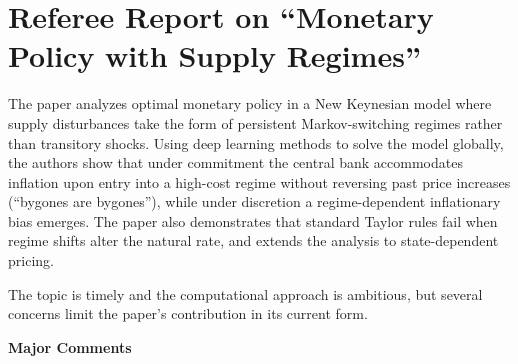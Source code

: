 \documentclass[12pt]{article}
\begin{document}

\section*{Referee Report on ``Monetary Policy with Supply Regimes''}

The paper analyzes optimal monetary policy in a New Keynesian model where supply disturbances take the form of persistent Markov-switching regimes rather than transitory shocks. Using deep learning methods to solve the model globally, the authors show that under commitment the central bank accommodates inflation upon entry into a high-cost regime without reversing past price increases (``bygones are bygones''), while under discretion a regime-dependent inflationary bias emerges. The paper also demonstrates that standard Taylor rules fail when regime shifts alter the natural rate, and extends the analysis to state-dependent pricing. 

The topic is timely and the computational approach is ambitious, but several concerns limit the paper's contribution in its current form.

\medskip

\textbf{Major Comments}
\end{document}
